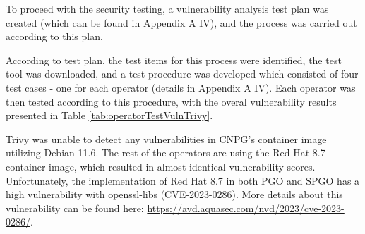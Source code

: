 

To proceed with the security testing, a vulnerability analysis test plan was created (which can be found in Appendix A IV), and the process was carried out according to this plan.

According to test plan, the test items for this process were identified, the test tool was downloaded, and a test procedure was developed which consisted of four test cases - one for each operator (details in Appendix A IV). Each operator was then tested according to this procedure, with the overal vulnerability results presented in Table \ref{tab:operatorTestVulnTrivy}.

Trivy was unable to detect any vulnerabilities in CNPG's container image utilizing Debian 11.6. The rest of the operators are using the Red Hat 8.7 container image, which resulted in almost identical vulnerability scores.
Unfortunately, the implementation of Red Hat 8.7 in both PGO and SPGO has a high vulnerability with openssl-libs (CVE-2023-0286).
More details about this vulnerability can be found here: \url{https://avd.aquasec.com/nvd/2023/cve-2023-0286/}.

